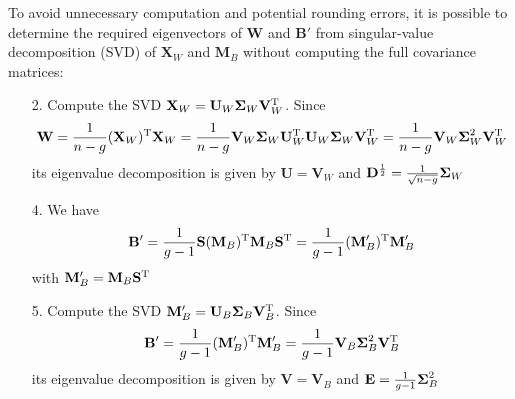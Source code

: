 \documentclass[a4paper]{article}
\begin{document}
To avoid unnecessary computation and potential rounding errors, it is possible to determine the required eigenvectors of $\mathbf{W}$ and $\mathbf{B}'$ from singular-value decomposition (SVD) of $\mathbf{X}_W$ and $\mathbf{M}_B$ without computing the full covariance matrices:

\begin{itemize}
\item[2.] Compute the SVD $\mathbf{X}_W = \mathbf{U}_W \boldsymbol{\Sigma}_W \mathbf{V}_W^{\text{T}}$. Since
  \[
    \mathbf{W} = \frac1{n - g} (\mathbf{X}_W)^{\text{T}} \mathbf{X}_W
    = \frac1{n - g} \mathbf{V}_W \boldsymbol{\Sigma}_W \mathbf{U}_W^{\text{T}} \mathbf{U}_W \boldsymbol{\Sigma}_W \mathbf{V}_W^{\text{T}}
    = \frac1{n - g} \mathbf{V}_W \boldsymbol{\Sigma}_W^2 \mathbf{V}_W^{\text{T}}
  \]
  its eigenvalue decomposition is given by $\mathbf{U} = \mathbf{V}_W$ and $\mathbf{D}^{\frac12} = \frac1{\sqrt{n - g}} \boldsymbol{\Sigma}_W$
\item[4.] We have
  \[
    \mathbf{B}' = \frac1{g - 1} \mathbf{S} (\mathbf{M}_B)^{\text{T}} \mathbf{M}_B \mathbf{S}^{\text{T}}
     = \frac1{g - 1} (\mathbf{M}_B')^{\text{T}} \mathbf{M}_B'
   \]
   with $\mathbf{M}_B' = \mathbf{M}_B \mathbf{S}^{\text{T}}$
\item[5.] Compute the SVD $\mathbf{M}_B' = \mathbf{U}_{B} \boldsymbol{\Sigma}_{B} \mathbf{V}_B^{\text{T}}$. Since
  \[
    \mathbf{B}' = \frac1{g - 1} (\mathbf{M}_B')^{\text{T}} \mathbf{M}_B'
    = \frac1{g - 1} \mathbf{V}_B \boldsymbol{\Sigma}_B^2 \mathbf{V}_B^{\text{T}}
  \]
  its eigenvalue decomposition is given by $\mathbf{V} = \mathbf{V}_B$ and $\mathbf{E} = \frac1{g - 1} \boldsymbol{\Sigma}_B^2$

\end{itemize}


\section{}
\label{sec:A}

\subsection{}
\label{sec:A:}


\section{}
\label{sec:B}

\subsection{}
\label{sec:B:}



  

\newpage
\listoftodos
\end{document}
